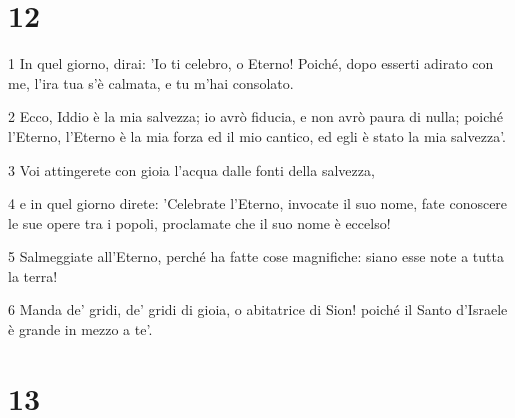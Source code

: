 \chapter{12}

\par 1 In quel giorno, dirai: 'Io ti celebro, o Eterno! Poiché, dopo esserti adirato con me, l'ira tua s'è calmata, e tu m'hai consolato.
\par 2 Ecco, Iddio è la mia salvezza; io avrò fiducia, e non avrò paura di nulla; poiché l'Eterno, l'Eterno è la mia forza ed il mio cantico, ed egli è stato la mia salvezza'.
\par 3 Voi attingerete con gioia l'acqua dalle fonti della salvezza,
\par 4 e in quel giorno direte: 'Celebrate l'Eterno, invocate il suo nome, fate conoscere le sue opere tra i popoli, proclamate che il suo nome è eccelso!
\par 5 Salmeggiate all'Eterno, perché ha fatte cose magnifiche: siano esse note a tutta la terra!
\par 6 Manda de' gridi, de' gridi di gioia, o abitatrice di Sion! poiché il Santo d'Israele è grande in mezzo a te'.

\chapter{13}

